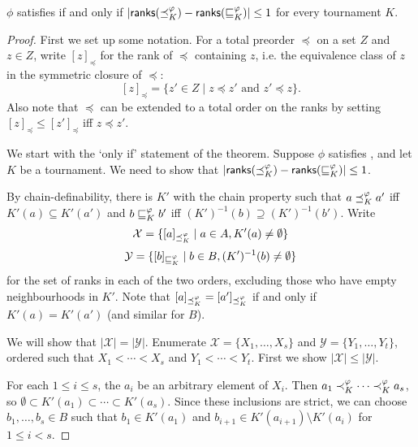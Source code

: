 \begin{theorem}
    \label{tourn_result_chain_def_ranks_characterisation}

    $\phi$ satisfies \chaindef{} if and only if $|\mathsf{ranks}({\preceq_K^\varphi})
    - \mathsf{ranks}({\sqsubseteq_K^\varphi})| \le 1$ for every tournament $K$.
\end{theorem}

\begin{proof}

    First we set up some notation. For a total preorder $\preceq$ on a set $Z$
    and $z \in Z$, write $[z]_{\preceq}$ for the rank of ${\preceq}$ containing
    $z$, i.e. the equivalence class of $z$ in the symmetric closure of
    ${\preceq}$:
    \[
        [z]_{\preceq}
        = \{z' \in Z \mid z \preceq z' \text{ and } z' \preceq z\}.
    \]
    Also note that $\preceq$ can be extended to a total order on the ranks by
    setting $[z]_{\preceq} \le [z']_{\preceq}$ iff $z \preceq z'$.

    We start with the `only if' statement of the theorem. Suppose
    $\phi$ satisfies \chaindef{}, and let $K$ be a tournament. We need
    to show that $|\mathsf{ranks}({\preceq_K^\varphi}) - \mathsf{ranks}({\sqsubseteq_K^\varphi})| \le 1$.

    By chain-definability, there is $K'$ with the chain property such that $a
    \preceq_K^\varphi a'$ iff $K'(a) \subseteq K'(a')$ and $b \sqsubseteq_K^\varphi b'$ iff
    $(K')^{-1}(b) \supseteq (K')^{-1}(b')$. Write
    \[ \mathcal{X} = \{ [a]_{\preceq_K^\varphi} \mid a \in A, K'(a) \ne \emptyset \} \]
    \[ \mathcal{Y} = \{ [b]_{\sqsubseteq_K^\varphi} \mid b \in B, (K')^{-1}(b) \ne \emptyset \} \]
    for the set of ranks in each of the two orders, excluding those who have
    empty neighbourhoods in $K'$. Note that $[a]_{\preceq_K^\varphi} =
    [a']_{\preceq_K^\varphi}$ if and only if $K'(a) = K'(a')$ (and similar for $B$).

    We will show that $|\mathcal{X}| = |\mathcal{Y}|$. Enumerate $\mathcal{X} =
    \{X_1,\ldots,X_s\}$ and $\mathcal{Y} = \{Y_1,\ldots,Y_t\}$, ordered such
    that $X_1 < \cdots < X_s$ and $Y_1 < \cdots < Y_t$. First we show
    $|\mathcal{X}| \le |\mathcal{Y}|$.

    For each $1 \le i \le s$, the $a_i$ be an arbitrary element of $X_i$. Then
    $a_1 \prec_K^\varphi \cdots \prec_K^\varphi a_s$, so $\emptyset \subset K'(a_1)
    \subset \cdots \subset K'(a_s)$. Since these inclusions are strict, we can
    choose $b_1,\ldots,b_s \in B$ such that $b_1 \in K'(a_1)$ and $b_{i+1} \in
    K'(a_{i+1}) \setminus K'(a_i)$ for $1 \le i < s$.


\end{proof}
